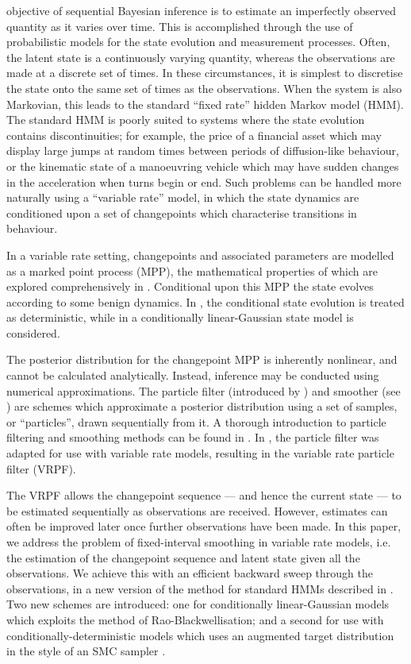 \documentclass[peerreview,11pt,draftcls,onecolumn]{IEEEtran}
\begin{document}
 objective of sequential Bayesian inference is to estimate an imperfectly observed quantity as it varies over time. This is accomplished through the use of probabilistic models for the state evolution and measurement processes. Often, the latent state is a continuously varying quantity, whereas the observations are made at a discrete set of times. In these circumstances, it is simplest to discretise the state onto the same set of times as the observations. When the system is also Markovian, this leads to the standard ``fixed rate'' hidden Markov model (HMM). The standard HMM is poorly suited to systems where the state evolution contains discontinuities; for example, the price of a financial asset which may display large jumps at random times between periods of diffusion-like behaviour, or the kinematic state of a manoeuvring vehicle which may have sudden changes in the acceleration when turns begin or end. Such problems can be handled more naturally using a ``variable rate'' model, in which the state dynamics are conditioned upon a set of changepoints which characterise transitions in behaviour.

In a variable rate setting, changepoints and associated parameters are modelled as a marked point process (MPP), the mathematical properties of which are explored comprehensively in \cite{Jacobsen2006}. Conditional upon this MPP the state evolves according to some benign dynamics. In \cite{Godsill2007,Whiteley2011,Morelande2009a}, the conditional state evolution is treated as deterministic, while in \cite{Godsill2007a,Christensen2012} a conditionally linear-Gaussian state model is considered.

The posterior distribution for the changepoint MPP is inherently nonlinear, and cannot be calculated analytically. Instead, inference may be conducted using numerical approximations. The particle filter (introduced by \cite{Gordon1993}) and smoother (see \cite{Doucet2000a,Godsill2004}) are schemes which approximate a posterior distribution using a set of samples, or ``particles'', drawn sequentially from it.  A thorough introduction to particle filtering and smoothing methods can be found in \cite{Cappe2007,Doucet2009}. In \cite{Godsill2007a,Godsill2007,Whiteley2011}, the particle filter was adapted for use with variable rate models, resulting in the variable rate particle filter (VRPF).

The VRPF allows the changepoint sequence --- and hence the current state --- to be estimated sequentially as observations are received. However, estimates can often be improved later once further observations have been made. In this paper, we address the problem of fixed-interval smoothing in variable rate models, i.e. the estimation of the changepoint sequence and latent state given all the observations. We achieve this with an efficient backward sweep through the observations, in a new version of the method for standard HMMs described in \cite{Godsill2004}. Two new schemes are introduced: one for conditionally linear-Gaussian models which exploits the method of Rao-Blackwellisation; and a second for use with conditionally-deterministic models which uses an augmented target distribution in the style of an SMC sampler \cite{DelMoral2006}.
\end{document}
